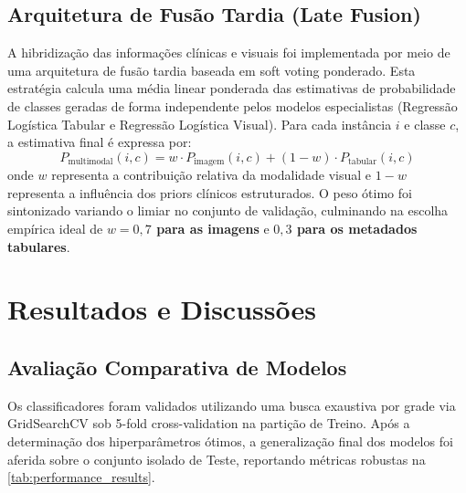 \documentclass[10pt,twocolumn,letterpaper]{article}
\begin{document}
\subsection{Arquitetura de Fusão Tardia (Late Fusion)}
A hibridização das informações clínicas e visuais foi implementada por meio de uma arquitetura de fusão tardia baseada em soft voting ponderado. Esta estratégia calcula uma média linear ponderada das estimativas de probabilidade de classes geradas de forma independente pelos modelos especialistas (Regressão Logística Tabular e Regressão Logística Visual). Para cada instância $i$ e classe $c$, a estimativa final é expressa por:
\begin{equation}
    P_{\text{multimodal}}(i, c) = w \cdot P_{\text{imagem}}(i, c) + (1 - w) \cdot P_{\text{tabular}}(i, c)
    \label{eq:late_fusion}
\end{equation}
onde $w$ representa a contribuição relativa da modalidade visual e $1-w$ representa a influência dos priors clínicos estruturados. O peso ótimo foi sintonizado variando o limiar no conjunto de validação, culminando na escolha empírica ideal de \textbf{$w=0,7$ para as imagens} e \textbf{$0,3$ para os metadados tabulares}.

\section{Resultados e Discussões}
\label{sec:resultados}

\subsection{Avaliação Comparativa de Modelos}
Os classificadores foram validados utilizando uma busca exaustiva por grade via GridSearchCV sob 5-fold cross-validation na partição de Treino. Após a determinação dos hiperparâmetros ótimos, a generalização final dos modelos foi aferida sobre o conjunto isolado de Teste, reportando métricas robustas na \cref{tab:performance_results}.
\end{document}
